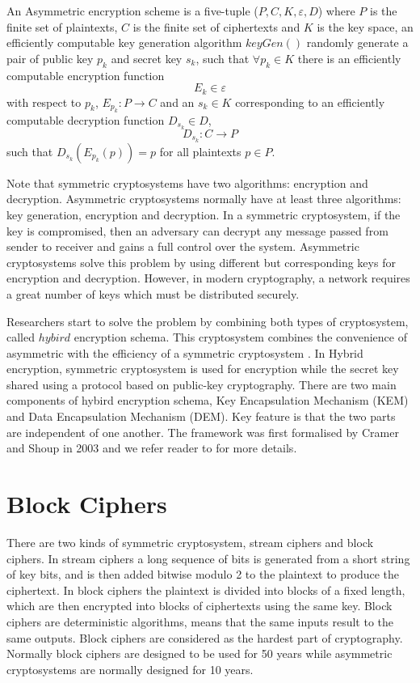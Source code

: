 \begin{mydef} 
	An Asymmetric encryption scheme is a five-tuple ($P,C,K,\varepsilon,D$) where $P$ is the finite set of plaintexts, $C$ is the finite set of ciphertexts and $K$ is the key space, an efficiently computable key generation algorithm $keyGen()$ randomly generate a pair of public key $p_{k}$ and secret key $s_{k}$, such that $\forall p_{k} \in K$ there is an efficiently computable encryption function 
	$$E_{k} \in \varepsilon$$ with respect to $p_{k}$, $E_{p_{k}} : P \rightarrow C $ and an $s_{k} \in K$ corresponding to an efficiently computable decryption function $D_{s_{k}} \in D$, $$ D_{s_{k}} : C \rightarrow P$$ such that $D_{s_{k}}(E_{p_{k}}(p)) = p $ for all plaintexts $p \in P$.
\end{mydef}
Note that symmetric cryptosystems have two algorithms: encryption and decryption. Asymmetric cryptosystems normally have at least three algorithms: key generation, encryption and decryption. In a symmetric cryptosystem, if the key is compromised, then an adversary can decrypt any message passed from sender to receiver and gains a full control over the system. Asymmetric cryptosystems solve this problem by using different but corresponding keys for encryption and decryption. However, in modern cryptography, a network requires a great number of keys which must be distributed securely. 

Researchers start to solve the problem by combining both types of cryptosystem, called $hybird$ encryption schema. This cryptosystem combines the convenience of asymmetric with the efficiency of a symmetric cryptosystem \cite{simmons1992contemporary}. In Hybrid encryption, symmetric cryptosystem is used for encryption while the secret key shared using a protocol based on public-key cryptography. There are two main components of hybird encryption schema, Key Encapsulation Mechanism (KEM) and Data Encapsulation Mechanism (DEM). Key feature is that the two parts are independent of one another. The framework was first formalised by Cramer and Shoup in 2003 and we refer reader to \cite{cramer2003design} for more details.

\section{Block Ciphers}
There are two kinds of symmetric cryptosystem, stream ciphers and block ciphers. In stream ciphers a long sequence of bits is generated from a short string of key bits, and is then added bitwise modulo 2 to the plaintext to produce the ciphertext. In block ciphers the plaintext is divided into blocks of a fixed length, which are then encrypted into blocks of ciphertexts using the same key. Block ciphers are deterministic algorithms, means that the same inputs result to the same outputs. Block ciphers are considered as the hardest part of cryptography. Normally block ciphers are designed to be used for 50 years while asymmetric cryptosystems are normally designed for 10 years. 

